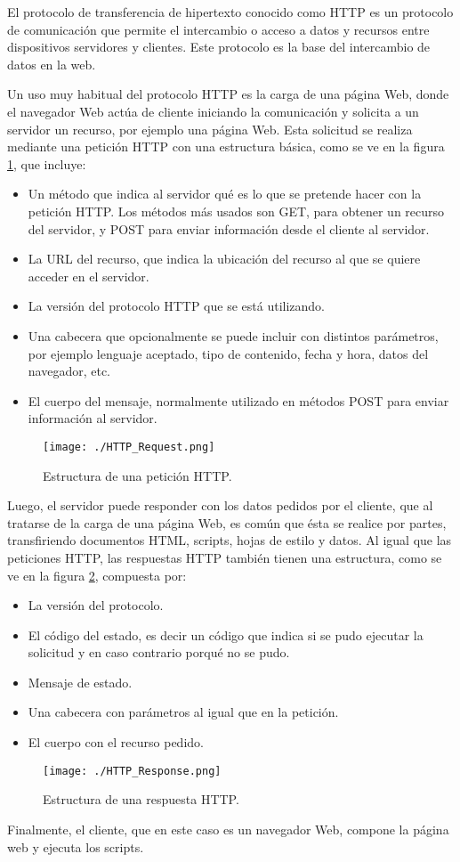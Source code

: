 El protocolo de transferencia de hipertexto conocido como HTTP es un protocolo de comunicación que permite el intercambio o acceso a datos y recursos entre dispositivos servidores y clientes. Este protocolo es la base del intercambio de datos en la web.
 
Un uso muy habitual del protocolo HTTP es la carga de una página Web, donde el navegador Web actúa de cliente iniciando la comunicación y solicita a un servidor un recurso, por ejemplo una página Web. Esta solicitud se realiza mediante una petición HTTP con una estructura básica, como se ve en la figura \ref{fig:HTTP_Req}, que incluye:
\begin{itemize}
	\item Un método que indica al servidor qué es lo que se pretende hacer con la petición HTTP. Los métodos más usados son GET, para obtener un recurso del servidor, y POST para enviar información desde el cliente al servidor.
	\item La URL del recurso, que indica la ubicación del recurso al que se quiere acceder en el servidor.
	\item La versión del protocolo HTTP que se está utilizando.
	\item Una cabecera que opcionalmente se puede incluir con distintos parámetros, por ejemplo lenguaje aceptado, tipo de contenido, fecha y hora, datos del navegador, etc. 
	\item El cuerpo del mensaje, normalmente utilizado en métodos POST para enviar información al servidor.
\end{itemize}

\begin{figure}[H]
	\centering
	\texttt{[image: ./HTTP\_Request.png]}
	\caption{Estructura de una petición HTTP.}
	\label{fig:HTTP_Req}
\end{figure}

Luego, el servidor puede responder con los datos pedidos por el cliente, que al tratarse de la carga de una página Web, es común que ésta se realice por partes, transfiriendo documentos HTML, scripts, hojas de estilo y datos.
Al igual que las peticiones HTTP, las respuestas HTTP también tienen una estructura, como se ve en la figura \ref{fig:HTTP_Resp}, compuesta por:

\begin{itemize}
	\item La versión del protocolo.
	\item El código del estado, es decir un código que indica si se pudo ejecutar la solicitud y en caso contrario porqué no se pudo.
	\item Mensaje de estado.
	\item Una cabecera con parámetros al igual que en la petición.
	\item El cuerpo con el recurso pedido.
\end{itemize}

\begin{figure}[H]
	\centering
	\texttt{[image: ./HTTP\_Response.png]}
	\caption{Estructura de una respuesta HTTP.}
	\label{fig:HTTP_Resp}
\end{figure}

Finalmente, el cliente, que en este caso es un navegador Web, compone la página web y ejecuta los scripts.

